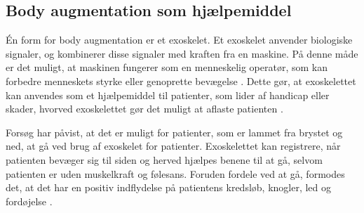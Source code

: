 \subsection{Body augmentation som hjælpemiddel}
Én form for body augmentation er et exoskelet. Et exoskelet  anvender biologiske signaler, og kombinerer disse signaler med kraften fra en maskine. På denne måde er det muligt, at maskinen fungerer som en menneskelig operatør, som kan forbedre menneskets styrke eller genoprette bevægelse \citep{yang2008}. Dette gør, at exoskelettet kan anvendes som et hjælpemiddel til patienter, som lider af handicap eller skader, hvorved exoskelettet gør det muligt at aflaste patienten \citep{bogue2015}.  

Forsøg har påvist, at det er muligt for patienter, som er lammet fra brystet og ned, at gå ved brug af exoskelet for patienter. Exoskelettet kan registrere, når patienten bevæger sig til siden og herved hjælpes benene til at gå, selvom patienten er uden muskelkraft og følesans. Foruden fordele ved at gå, formodes det, at det har en positiv indflydelse på patientens kredsløb, knogler, led og fordøjelse \citep{regmidt2015}. 